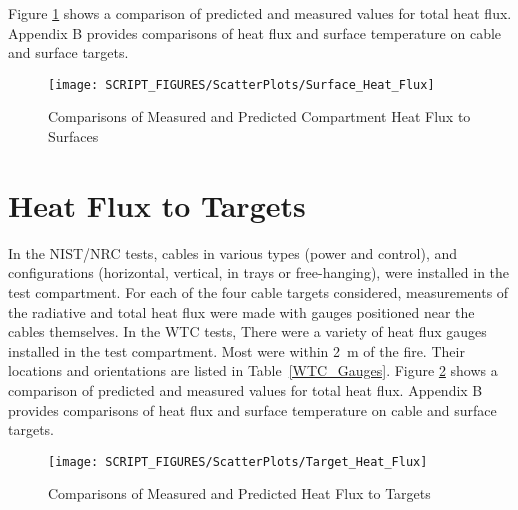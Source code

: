Figure \ref{fig:Surface_Flux_Scatter} shows a comparison of predicted and measured values for total heat flux. Appendix B provides comparisons of heat flux and surface temperature on cable and surface targets.
\label{Target Heat Flux}

\begin{figure}
\begin{center}
\texttt{[image: SCRIPT\_FIGURES/ScatterPlots/Surface\_Heat\_Flux]}
\end{center}
\caption{Comparisons of Measured and Predicted Compartment Heat Flux to Surfaces} \label{fig:Surface_Flux_Scatter}
\end{figure}


\section{Heat Flux to Targets}

In the NIST/NRC tests, cables in various types (power and control), and configurations (horizontal, vertical, in trays or free-hanging), were installed in the test compartment. For each of the four cable targets considered, measurements of the radiative and total heat flux were made with gauges positioned near the cables themselves.  In the WTC tests, There were a variety of heat flux gauges installed in the test compartment. Most were within 2~m of the fire. Their locations and orientations are listed in Table~\ref{WTC_Gauges}. Figure \ref{fig:Target_Flux_Scatter} shows a comparison of predicted and measured values for total heat flux. Appendix B provides comparisons of heat flux and surface temperature on cable and surface targets.
\label{Surface Heat Flux}
\label{Wall Heat Flux}
\label{Ceiling Heat Flux}
\label{Floor Heat Flux}

\begin{figure}
\begin{center}
\texttt{[image: SCRIPT\_FIGURES/ScatterPlots/Target\_Heat\_Flux]}
\end{center}
\caption{Comparisons of Measured and Predicted Heat Flux to Targets} \label{fig:Target_Flux_Scatter}
\end{figure}

